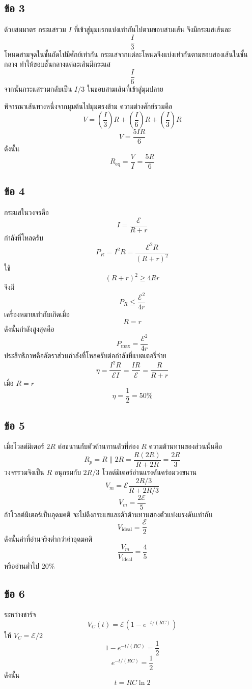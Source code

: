 \subsection*{ข้อ 3}
ด้วยสมมาตร กระแสรวม $I$ ที่เข้าสู่มุมแรกแบ่งเท่ากันไปตามขอบสามเส้น จึงมีกระแสเส้นละ
\[
\frac{I}{3}
\]
โหนดสามจุดในชั้นถัดไปมีศักย์เท่ากัน กระแสจากแต่ละโหนดจึงแบ่งเท่ากันตามขอบสองเส้นในชั้นกลาง ทำให้ขอบชั้นกลางแต่ละเส้นมีกระแส
\[
\frac{I}{6}
\]
จากนั้นกระแสรวมกลับเป็น $I/3$ ในขอบสามเส้นที่เข้าสู่มุมปลาย

พิจารณาเส้นทางหนึ่งจากมุมต้นไปมุมตรงข้าม ความต่างศักย์รวมคือ
\[
V=\left(\frac{I}{3}\right)R
+\left(\frac{I}{6}\right)R
+\left(\frac{I}{3}\right)R
\]
\[
V=\frac{5IR}{6}
\]
ดังนั้น
\[
\boxed{R_{\text{eq}}=\frac{V}{I}=\frac{5R}{6}}
\]

\subsection*{ข้อ 4}
กระแสในวงจรคือ
\[
I=\frac{\mathcal E}{R+r}
\]
กำลังที่โหลดรับ
\[
P_R=I^2R=\frac{\mathcal E^2R}{(R+r)^2}
\]
ใช้
\[
(R+r)^2\geq4Rr
\]
จึงมี
\[
P_R\leq\frac{\mathcal E^2}{4r}
\]
เครื่องหมายเท่ากับเกิดเมื่อ
\[
\boxed{R=r}
\]
ดังนั้นกำลังสูงสุดคือ
\[
\boxed{P_{\max}=\frac{\mathcal E^2}{4r}}
\]
ประสิทธิภาพคืออัตราส่วนกำลังที่โหลดรับต่อกำลังที่แบตเตอรี่จ่าย
\[
\eta=\frac{I^2R}{\mathcal EI}
=\frac{IR}{\mathcal E}
=\frac{R}{R+r}
\]
เมื่อ $R=r$
\[
\boxed{\eta=\frac12=50\%}
\]

\subsection*{ข้อ 5}
เมื่อโวลต์มิเตอร์ $2R$ ต่อขนานกับตัวต้านทานตัวที่สอง $R$ ความต้านทานของส่วนนั้นคือ
\[
R_p=R\parallel2R=\frac{R(2R)}{R+2R}=\frac{2R}{3}
\]
วงจรรวมจึงเป็น $R$ อนุกรมกับ $2R/3$ โวลต์มิเตอร์อ่านแรงดันคร่อมวงขนาน
\[
V_m=\mathcal E\frac{2R/3}{R+2R/3}
\]
\[
\boxed{V_m=\frac{2\mathcal E}{5}}
\]
ถ้าโวลต์มิเตอร์เป็นอุดมคติ จะไม่ดึงกระแสและตัวต้านทานสองตัวแบ่งแรงดันเท่ากัน
\[
\boxed{V_{\text{ideal}}=\frac{\mathcal E}{2}}
\]
ดังนั้นค่าที่อ่านจริงต่ำกว่าค่าอุดมคติ
\[
\frac{V_m}{V_{\text{ideal}}}=\frac{4}{5}
\]
หรืออ่านต่ำไป $20\%$

\subsection*{ข้อ 6}
ระหว่างชาร์จ
\[
V_C(t)=\mathcal E\left(1-e^{-t/(RC)}\right)
\]
ให้ $V_C=\mathcal E/2$
\[
1-e^{-t/(RC)}=\frac12
\]
\[
e^{-t/(RC)}=\frac12
\]
ดังนั้น
\[
\boxed{t=RC\ln2}
\]

